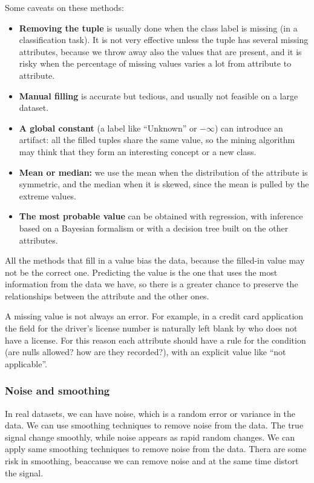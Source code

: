Some caveats on these methods:
\begin{itemize}
    \item \textbf{Removing the tuple} is usually done when the class label is missing (in a classification task). It is not very effective unless the tuple has several missing attributes, because we throw away also the values that are present, and it is risky when the percentage of missing values varies a lot from attribute to attribute.
    \item \textbf{Manual filling} is accurate but tedious, and usually not feasible on a large dataset.
    \item \textbf{A global constant} (a label like ``Unknown'' or $-\infty$) can introduce an artifact: all the filled tuples share the same value, so the mining algorithm may think that they form an interesting concept or a new class.
    \item \textbf{Mean or median:} we use the mean when the distribution of the attribute is symmetric, and the median when it is skewed, since the mean is pulled by the extreme values.
    \item \textbf{The most probable value} can be obtained with regression, with inference based on a Bayesian formalism or with a decision tree built on the other attributes.
\end{itemize}
All the methods that fill in a value bias the data, because the filled-in value may not be the correct one. Predicting the value is the one that uses the most information from the data we have, so there is a greater chance to preserve the relationships between the attribute and the other ones.
\begin{remark}
    A missing value is not always an error. For example, in a credit card application the field for the driver's license number is naturally left blank by who does not have a license. For this reason each attribute should have a rule for the  condition (are nulls allowed? how are they recorded?), with an explicit value like ``not applicable''.
\end{remark}

\subsubsection{Noise and smoothing}
In real datasets, we can have noise, which is a random error or variance in the data. We can use smoothing techniques to remove noise from the data. 
The true signal change smoothly, while noise appears as rapid random changes. We can apply same smoothing techniques to remove noise from the data. Thera are some risk in smoothing, beaccause we can remove noise and at the same time distort the signal.\\
\\

